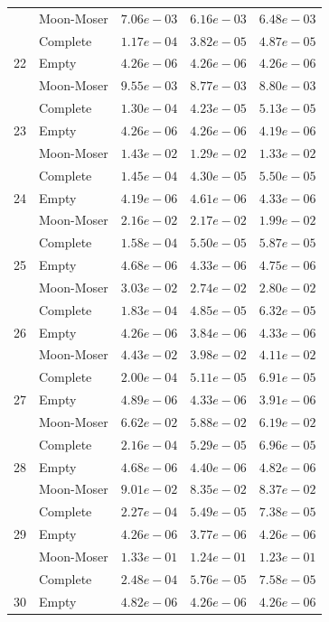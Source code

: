 \documentclass[12pt,a4paper]{article}
\begin{document}
\begin{longtable}{|l||l|l|l|l|}
  & Moon-Moser & $7.06e-03$ & $6.16e-03$ & $6.48e-03$ \\
  & Complete & $1.17e-04$ & $3.82e-05$ & $4.87e-05$ \\
  \hline
  22 & Empty & $4.26e-06$ & $4.26e-06$ & $4.26e-06$ \\
  & Moon-Moser & $9.55e-03$ & $8.77e-03$ & $8.80e-03$ \\
  & Complete & $1.30e-04$ & $4.23e-05$ & $5.13e-05$ \\
  \hline
  23 & Empty & $4.26e-06$ & $4.26e-06$ & $4.19e-06$ \\
  & Moon-Moser & $1.43e-02$ & $1.29e-02$ & $1.33e-02$ \\
  & Complete & $1.45e-04$ & $4.30e-05$ & $5.50e-05$ \\
  \hline
  24 & Empty & $4.19e-06$ & $4.61e-06$ & $4.33e-06$ \\
  & Moon-Moser & $2.16e-02$ & $2.17e-02$ & $1.99e-02$ \\
  & Complete & $1.58e-04$ & $5.50e-05$ & $5.87e-05$ \\
  \hline
  25 & Empty & $4.68e-06$ & $4.33e-06$ & $4.75e-06$ \\
  & Moon-Moser & $3.03e-02$ & $2.74e-02$ & $2.80e-02$ \\
  & Complete & $1.83e-04$ & $4.85e-05$ & $6.32e-05$ \\
  \hline
  26 & Empty & $4.26e-06$ & $3.84e-06$ & $4.33e-06$ \\
  & Moon-Moser & $4.43e-02$ & $3.98e-02$ & $4.11e-02$ \\
  & Complete & $2.00e-04$ & $5.11e-05$ & $6.91e-05$ \\
  \hline
  27 & Empty & $4.89e-06$ & $4.33e-06$ & $3.91e-06$ \\
  & Moon-Moser & $6.62e-02$ & $5.88e-02$ & $6.19e-02$ \\
  & Complete & $2.16e-04$ & $5.29e-05$ & $6.96e-05$ \\
  \hline
  28 & Empty & $4.68e-06$ & $4.40e-06$ & $4.82e-06$ \\
  & Moon-Moser & $9.01e-02$ & $8.35e-02$ & $8.37e-02$ \\
  & Complete & $2.27e-04$ & $5.49e-05$ & $7.38e-05$ \\
  \hline
  29 & Empty & $4.26e-06$ & $3.77e-06$ & $4.26e-06$ \\
  & Moon-Moser & $1.33e-01$ & $1.24e-01$ & $1.23e-01$ \\
  & Complete & $2.48e-04$ & $5.76e-05$ & $7.58e-05$ \\
  \hline
  30 & Empty & $4.82e-06$ & $4.26e-06$ & $4.26e-06$ \\

\end{longtable}
\end{document}
